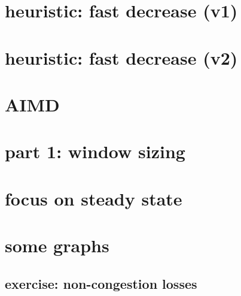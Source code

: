 \section{heuristic: fast decrease (v1)}


\section{heuristic: fast decrease (v2)}


\section{AIMD}


\section{part 1: window sizing}

\section{focus on steady state}


\section{some graphs}



\subsection{exercise: non-congestion losses} %






